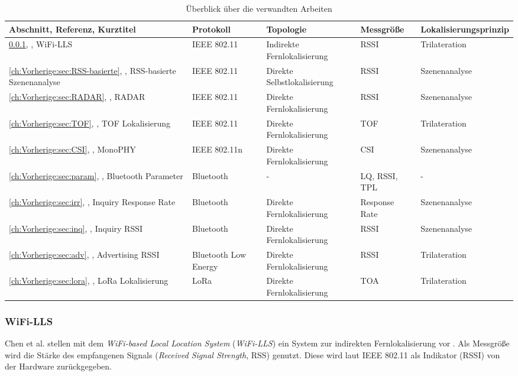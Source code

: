 \begin{table}[h!]
	\centering
	\caption{Überblick über die verwandten Arbeiten}
	\label{table:verwandte}
	\begin{tabular}{p{3.7cm}|p{1.7cm}|p{2cm}|p{2cm}|p{2.3cm}}
		Abschnitt, Referenz, Kurztitel & Protokoll & Topologie & Messgröße & Lokalisier\-ungsprinzip\\
		\hline
		\ref{ch:Vorherige:sec:LLS}, \cite{chen2007design}, WiFi-LLS & IEEE 802.11 & Indirekte Fernlokalisierung & RSSI & Trilateration \\
		\hline
		\ref{ch:Vorherige:sec:RSS-basierte}, \cite{prasithsangaree2002indoor}, RSS-basierte Szenenanalyse & IEEE 802.11 & Direkte Selbstlokalisierung & RSSI & Szenenanalyse \\
		\hline
		\ref{ch:Vorherige:sec:RADAR}, \cite{bahl2000radar}, RADAR & IEEE 802.11 & Direkte Fernlokalisierung & RSSI & Szenenanalyse \\
		\hline
		\ref{ch:Vorherige:sec:TOF}, \cite{wibowo2009time}, TOF Lokalisierung & IEEE 802.11 & Direkte Fernlokalisierung & TOF & Trilateration \\
		\hline
		\ref{ch:Vorherige:sec:CSI}, \cite{abdel2013monophy}, MonoPHY & IEEE 802.11n & Direkte Fernlokalisierung & CSI & Szenenanalyse \\
		\hline
		\ref{ch:Vorherige:sec:param}, \cite{hossain2007comprehensive}, Bluetooth Parameter & Bluetooth & - & LQ, RSSI, TPL & - \\
		\hline
		\ref{ch:Vorherige:sec:irr}, \cite{bargh2008indoor}, Inquiry Response Rate & Bluetooth & Direkte Fernlokalisierung & Response Rate & Szenenanalyse \\
		\hline
		\ref{ch:Vorherige:sec:inq}, \cite{ling2010inquiry}, Inquiry RSSI & Bluetooth & Direkte Fernlokalisierung & RSSI & Szenenanalyse \\
		\hline
		\ref{ch:Vorherige:sec:adv}, \cite{jianyong2014rssi}, Advertising RSSI & Bluetooth Low Energy & Direkte Fernlokalisierung & RSSI & Trilateration \\
		\hline
		\ref{ch:Vorherige:sec:lora}, \cite{kim2016poster}, LoRa Lokalisierung & LoRa & Direkte Fernlokalisierung & TOA & Trilateration \\
	\end{tabular}
\end{table}

\subsubsection{WiFi-LLS}
\label{ch:Vorherige:sec:LLS}
Chen et al. stellen mit dem \emph{WiFi-based Local Location System} (\emph{WiFi-LLS}) ein System zur indirekten Fernlokalisierung vor \cite{chen2007design}.
Als Messgröße wird die Stärke des empfangenen Signals (\emph{Received Signal Strength}, RSS) genutzt. 
Diese wird laut IEEE 802.11 als Indikator (RSSI) von der Hardware zurückgegeben. 

